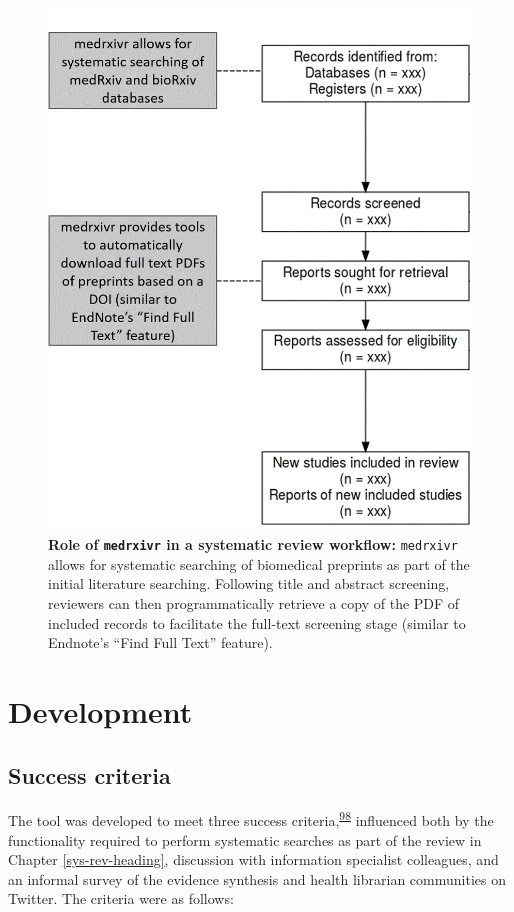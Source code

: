 \documentclass[a4paper, twoside]{templates/ociamthesis}
\begin{document}
\begin{figure}

{\centering \includegraphics[width=0.65\linewidth]{figures/sys-rev-tools/medrxiv-role} 

}

\caption[Role of \texttt{medrxivr} in a systematic review workflow]{\textbf{Role of \texttt{medrxivr} in a systematic review workflow:} \texttt{medrxivr} allows for systematic searching of biomedical preprints as part of the initial literature searching. Following title and abstract screening, reviewers can then programmatically retrieve a copy of the PDF of included records to facilitate the full-text screening stage (similar to Endnote's ``Find Full Text'' feature).}\label{fig:medrxivr-sr}
\end{figure}

\hypertarget{development}{%
\section{Development}\label{development}}

\hypertarget{success-criteria}{%
\subsection{Success criteria}\label{success-criteria}}

The tool was developed to meet three success criteria,\textsuperscript{\protect\hyperlink{ref-wateridge1995}{98}} influenced both by the functionality required to perform systematic searches as part of the review in Chapter \ref{sys-rev-heading}, discussion with information specialist colleagues, and an informal survey of the evidence synthesis and health librarian communities on Twitter. The criteria were as follows:
\end{document}
